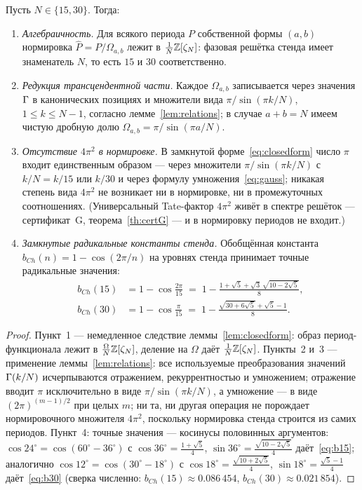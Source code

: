 \begin{theorem}\label{th:normalization}
Пусть $N\in\{15,30\}$. Тогда:
\begin{enumerate}[leftmargin=2em, itemsep=0.15em]
\item \emph{Алгебраичность.} Для всякого периода $P$ собственной
  формы $(a,b)$ нормировка $\widehat P=P/\Omega_{a,b}$ лежит в
  $\frac1N\mathbb{Z}[\zeta_N]$: фазовая решётка стенда имеет знаменатель
  $N$, то есть $15$ и $30$ соответственно.
\item \emph{Редукция трансцендентной части.} Каждое $\Omega_{a,b}$
  записывается через значения $\Gamma$ в канонических позициях и
  множители вида $\pi/\sin(\pi k/N)$, $1\le k\le N-1$, согласно
  лемме~\ref{lem:relations}; в случае $a+b=N$ имеем чистую дробную
  долю $\Omega_{a,b}=\pi/\sin(\pi a/N)$.
\item \emph{Отсутствие $4\pi^2$ в нормировке.} В замкнутой
  форме~\eqref{eq:closedform} число $\pi$ входит единственным
  образом --- через множители $\pi/\sin(\pi k/N)$ с $k/N=k/15$ или
  $k/30$ и через формулу умножения~\eqref{eq:gauss}; никакая степень
  вида $4\pi^2$ не возникает ни в нормировке, ни в промежуточных
  соотношениях. (Универсальный Tate-фактор $4\pi^2$ живёт в спектре
  решёток --- сертификат~G, теорема~\ref{th:certG} --- и в нормировку
  периодов не входит.)
\item \emph{Замкнутые радикальные константы стенда.} Обобщённая
  константа $b_{Ch}(n)=1-\cos(2\pi/n)$ на уровнях стенда принимает
  точные радикальные значения:
  \begin{align}
    b_{Ch}(15) &= 1-\cos\frac{2\pi}{15}
      \;=\;1-\frac{1+\sqrt5+\sqrt3\,\sqrt{10-2\sqrt5}}{8},
      \label{eq:b15}\\
    b_{Ch}(30) &= 1-\cos\frac{\pi}{15}
      \;=\;1-\frac{\sqrt{30+6\sqrt5}+\sqrt5-1}{8}.
      \label{eq:b30}
  \end{align}
\end{enumerate}
\end{theorem}

\begin{proof}
Пункт~1 --- немедленное следствие леммы~\ref{lem:closedform}: образ
период-функционала лежит в $\frac{\Omega}{N}\mathbb{Z}[\zeta_N]$, деление
на $\Omega$ даёт $\frac1N\mathbb{Z}[\zeta_N]$. Пункты~2 и~3 --- применение
леммы~\ref{lem:relations}: все используемые преобразования значений
$\Gamma(k/N)$ исчерпываются отражением, рекуррентностью и умножением;
отражение вводит $\pi$ исключительно в виде $\pi/\sin(\pi k/N)$, а
умножение --- в виде $(2\pi)^{(m-1)/2}$ при целых $m$; ни та, ни
другая операция не порождает нормировочного множителя $4\pi^2$,
поскольку нормировка стенда строится из самих периодов. Пункт~4:
точные значения --- косинусы половинных аргументов:
$\cos24^\circ=\cos(60^\circ-36^\circ)$ с
$\cos36^\circ=\frac{1+\sqrt5}{4}$,
$\sin36^\circ=\frac{\sqrt{10-2\sqrt5}}{4}$ даёт~\eqref{eq:b15};
аналогично $\cos12^\circ=\cos(30^\circ-18^\circ)$ с
$\cos18^\circ=\frac{\sqrt{10+2\sqrt5}}{4}$,
$\sin18^\circ=\frac{\sqrt5-1}{4}$ даёт~\eqref{eq:b30}
(сверка численно: $b_{Ch}(15)\approx0.086\,454$,
$b_{Ch}(30)\approx0.021\,854$).
\end{proof}

